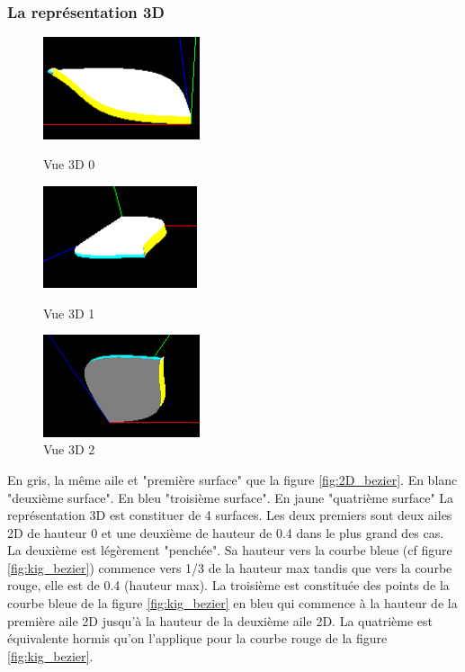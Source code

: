 \documentclass{article}
\begin{document}
\subsubsection{La représentation 3D}

\begin{figure}[!htb]
	\centering
	\begin{minipage}{0.3\textwidth}
    	\centering
    	\includegraphics[height=3cm]{./assets/3D_0_bezier.png}
    	\caption{Vue 3D 0}
    	\label{fig:3D_0_bezier}
	\end{minipage}
	\begin{minipage}{0.3\textwidth}
    	\centering
    	\includegraphics[height=3cm]{./assets/3D_1_bezier.png}
    	\caption{Vue 3D 1}
    	\label{fig:3D_1_bezier}
	\end{minipage}
	\begin{minipage}{0.3\textwidth}
    	\centering
    	\includegraphics[height=3cm]{./assets/3D_2_bezier.png}
    	\caption{Vue 3D 2}
    	\label{fig:3D_2_bezier}
	\end{minipage}
\end{figure}
En gris, la même aile et "première surface" que la figure \ref{fig:2D_bezier}. En blanc "deuxième surface". En bleu "troisième surface". En jaune "quatrième surface"
\newline
\newline
La représentation 3D est constituer de 4 surfaces. Les deux premiers sont deux ailes 2D de hauteur 0 et une deuxième de hauteur de 0.4 dans le plus grand des cas. La deuxième est légèrement "penchée". Sa hauteur vers la courbe bleue (cf figure \ref{fig:kig_bezier}) commence vers 1/3 de la hauteur max tandis que vers la courbe rouge, elle est de 0.4 (hauteur max). La troisième est constituée des points de la courbe bleue de la figure \ref{fig:kig_bezier} en bleu qui commence à la hauteur de la première aile 2D jusqu'à la hauteur de la deuxième aile 2D. La quatrième est équivalente hormis qu'on l'applique pour la courbe rouge de la figure \ref{fig:kig_bezier}.
\end{document}
